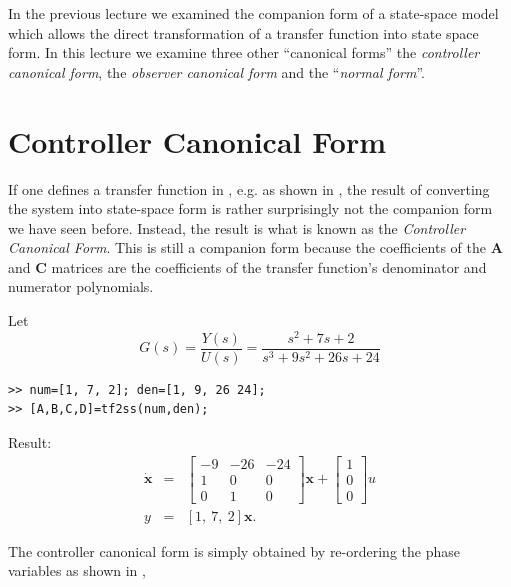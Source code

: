\def\FileDate{98/11/03}
\def\FileVersion{1.0}

In the previous lecture we examined the companion form of a
state-space model which allows the direct transformation of a transfer
function into state space form. In this lecture we examine three
other ``canonical forms'' the \emph{controller canonical form},
the \emph{observer canonical form} and the ``\emph{normal form}''. 


\section*{Controller Canonical Form}
If one defines a transfer function in \Matlab{}, e.g. as shown in
, the result of converting the system into
state-space form is rather surprisingly not the companion form we
have seen before. Instead, the result is what is known as the
\emph{Controller Canonical Form}. This is still a companion form
because the coefficients of the $\mathbf{A}$ and $\mathbf{C}$
matrices are the coefficients of the transfer function's
denominator and numerator polynomials.
\begin{slide}\label{slide:l5s5}
Let \[ G(s)
=\frac{Y(s)}{U(s)} = \frac{s^2 + 7s + 2 }{s^3 + 9s^2 + 26s + 24}\]
\begin{verbatim}
>> num=[1, 7, 2]; den=[1, 9, 26 24];
>> [A,B,C,D]=tf2ss(num,den);
\end{verbatim}
Result:
\begin{eqnarray*}
\dot{\mathbf{x}} & = &\left[\begin{array}{ccc}
  -9 & -26 & -24  \\
  1 & 0 & 0  \\
  0 & 1  & 0
 \end{array}\right]\mathbf{x}+\left[\begin{array}{c}
  1 \\
  0 \\
  0
\end{array}\right]u\\
y & = & [1,\ 7,\ 2] \mathbf{x}.\end{eqnarray*}
\end{slide}
The controller canonical form is simply obtained by re-ordering
the phase variables as shown in ,
